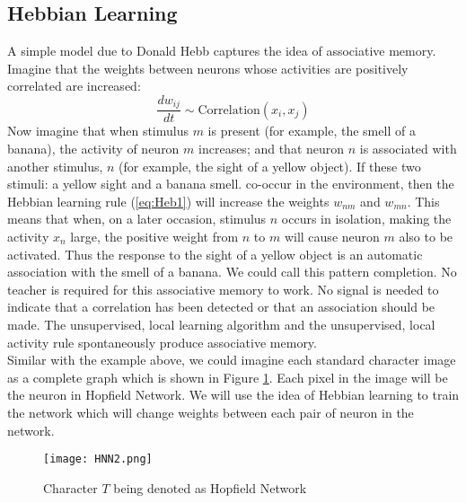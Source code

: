 \subsection{Hebbian Learning}
A simple model due to Donald Hebb captures the idea of associative memory. Imagine that the weights between neurons whose activities are positively correlated are increased:
\begin{equation}
	\label{eq:Heb1}
	\frac{dw_{ij}}{dt} \sim \text{Correlation}(x_i, x_j)
  \end{equation}
  Now imagine that when stimulus $m$ is present (for example, the smell of a banana), the activity of neuron $m$ increases; and that neuron $n$ is associated with another stimulus, $n$ (for example, the sight of a yellow object). If these two stimuli: a yellow sight and a banana smell. co-occur in the environment, then the Hebbian learning rule (\ref{eq:Heb1}) will increase the weights $w_{nm}$ and $w_{mn}$. This means that when, on a later occasion, stimulus $n$ occurs in isolation, making the activity $x_n$ large, the positive weight from $n$ to $m$ will cause neuron $m$ also to be activated. Thus the response to the sight of a yellow object is an automatic association with the smell of a banana. We could call this pattern completion. No teacher is required for this associative memory to work. No signal is needed to indicate that a correlation has been detected or that an association should be made. The unsupervised, local learning algorithm and the unsupervised, local activity rule spontaneously produce associative memory.\\

  Similar with the example above, we could imagine each standard character image as a complete graph which is shown in Figure \ref{fg:HNN2}. Each pixel in the image will be the neuron in Hopfield Network. We will use the idea of Hebbian learning to train the network which will change weights between each pair of neuron in the network.\\
  \begin{figure}[h]
  \centering
  \texttt{[image: HNN2.png]}
  \caption{Character $T$ being denoted as Hopfield Network}
  \label{fg:HNN2}
  \end{figure}

